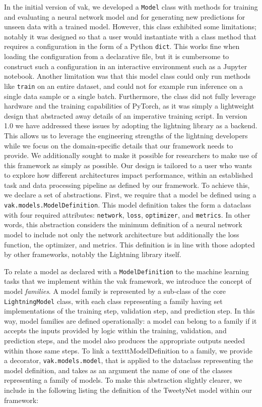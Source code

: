 In the initial version of vak, we developed a \texttt{Model} class with methods for training and evaluating a neural network model and for generating new predictions for unseen data with a trained model. However, this class exhibited some limitations; notably it was designed so that a user would instantiate with a class method that requires a configuration in the form of a Python \texttt{dict}. This works fine when loading the configuration from a declarative file, but it is cumbersome to construct such a configuration in an interactive environment such as a Jupyter notebook. Another limitation was that this model class could only run methods like \texttt{train} on an entire dataset, and could not for example run inference on a single data sample or a single batch. Furthermore, the class did not fully leverage hardware and the training capabilities of PyTorch, as it was simply a lightweight design that abstracted away details of an imperative training script.
In version 1.0 we have addressed these issues by adopting the lightning library as a backend. This allows us to leverage the engineering strengths of the lightning developers while we focus on the domain-specific details that our framework needs to provide. We additionally sought to make it possible for researchers to make use of this framework as simply as possible. Our design is tailored to a user who wants to explore how different architectures impact performance, within an established task and data processing pipeline as defined by our framework. To achieve this, we declare a set of abstractions.
First, we require that a model be defined using a \texttt{vak.models.ModelDefinition}. This model definition takes the form a dataclass with four required attributes: \texttt{network}, \texttt{loss}, \texttt{optimizer}, and \texttt{metrics}. In other words, this abstraction considers the minimum definition of a neural network model to include not only the network architecture but additionally the loss function, the optimizer, and metrics. This definition is in line with those adopted by other frameworks, notably the Lightning library itself.

To relate a model as declared with a \texttt{ModelDefinition} to the machine learning tasks that we implement within the vak framework, we introduce the concept of model \textit{families}. A model family is represented by a sub-class of the core \texttt{LightningModel} class, with each class representing a family having set implementations of the training step, validation step, and prediction step. In this way, model families are defined operationally: a model can belong to a family if it accepts the inputs provided by logic within the training, validation, and prediction steps, and the model also produces the appropriate outputs needed within those same steps.
To link a texttt{ModelDefinition} to a family, we provide a decorator, \texttt{vak.models.model}, that is applied to the dataclass representing the model definition, and takes as an argument the name of one of the classes representing a family of models. To make this abstraction slightly clearer, we include in the following listing the definition of the TweetyNet model within our framework:

